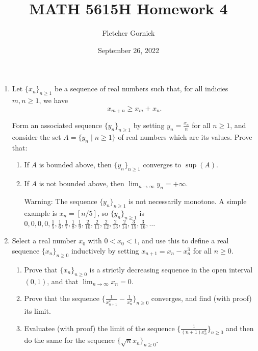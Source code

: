 \documentclass[11pt]{article}
\title{\vspace{-1.0cm}MATH 5615H Homework 4}
\author{Fletcher Gornick}
\date{September 26, 2022}
\begin{document}
 \maketitle
 \begin{enumerate}[leftmargin=0pt, label=\arabic*)]
   \item Let \(\{x_n\}_{n \geq 1}\) be a sequence of real numbers such that, for all indicies \(m, n \geq 1\), we have 
     \[x_{m+n} \geq x_m + x_n.\]

     Form an associated sequence \(\{y_n\}_{n \geq 1}\) by setting \(y_n = \frac{x_n}{n}\) for all \(n \geq 1\), and consider the set 
     \(A = \{y_n \;|\; n \geq 1\}\) of real numbers which are its values.  Prove that:
     \begin{enumerate}[label=(\roman*)]
       \item If \(A\) is bounded above, then \(\{y_n\}_{n \geq 1}\) converges to \(\sup(A)\).

       \item If \(A\) is not bounded above, then \(\displaystyle\lim_{n \to \infty} y_n = +\infty\).  

         Warning: The sequence \(\{y_n\}_{n \geq 1}\) is not necessarily monotone.  A simple example is \(x_n = [n/5]\), so
         \(\{y_n\}_{n \geq 1}\) is \(0,0,0,0,\frac{1}{5}, \frac{1}{6}, \frac{1}{7}, \frac{1}{8}, \frac{1}{9}, \frac{2}{10},
         \frac{2}{11}, \frac{2}{12}, \frac{2}{13}, \frac{2}{14}, \frac{3}{15}, \frac{3}{16}, \dots\)
     \end{enumerate}
     \newpage
     
   \item Select a real number \(x_0\) with \(0 < x_0 < 1\), and use this to define a real sequence \(\{x_n\}_{n \geq 0}\) 
     inductively by setting \(x_{n+1} = x_n - x_n^3\) for all \(n \geq 0\).
     \begin{enumerate}[label=(\roman*)]
       \item Prove that \(\{x_n\}_{n \geq 0}\) is a strictly decreasing sequence in the open interval \((0,1)\), and that 
         \(\displaystyle\lim_{n \to \infty} x_n = 0\).

       \item Prove that the sequence \(\Big\{\frac{1}{x_{n+1}^2} - \frac{1}{x_n^2}\Big\}_{n \geq 0}\) converges, and find (with 
         proof) its limit.
         
       \item Evaluatee (with proof) the limit of the sequence \(\Big\{\frac{1}{(n+1)x_n^2}\Big\}_{n \geq 0}\) and then do the 
         same for the sequence \(\{\sqrt{n}x_n\}_{n \geq 0}\).


\end{enumerate}
\end{enumerate}
\end{document}
